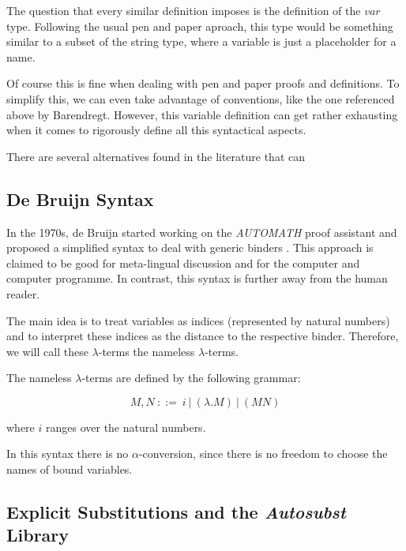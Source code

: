 The question that every similar definition imposes is the definition of the $var$ type. Following the usual pen and paper aproach, this type would be something similar to a subset of the string type, where a variable is just a placeholder for a name.

Of course this is fine when dealing with pen and paper proofs and definitions. To simplify this, we can even take advantage of conventions, like the one referenced above by Barendregt. However, this variable definition can get rather exhausting  when it comes to rigorously define all this syntactical aspects.

There are several alternatives found in the literature that can 


\subsection{De Bruijn Syntax}

In the 1970s, de Bruijn started working on the \textit{AUTOMATH} proof assistant and proposed a simplified syntax to deal with generic binders \cite{deBruijn}.
This approach is claimed to be good for meta-lingual discussion and for the computer and computer programme. In contrast, this syntax is further away from the human reader.

The main idea is to treat variables as indices (represented by natural numbers) and to interpret these indices as the distance to the respective binder.
Therefore, we will call these $\lambda$-terms the nameless $\lambda$-terms.

\begin{definition}
  The nameless $\lambda$-terms are defined by the following grammar:

  \[ M, N \ ::= \ i \ | \ (\lambda . M) \ | \ (M N) \]

  where $i$ ranges over the natural numbers.
\end{definition}

\begin{remark}
	In this syntax there is no $\alpha$-conversion, since there is no freedom to choose the names of bound variables.
\end{remark}

\subsection{Explicit Substitutions and the \textit{Autosubst} Library}



